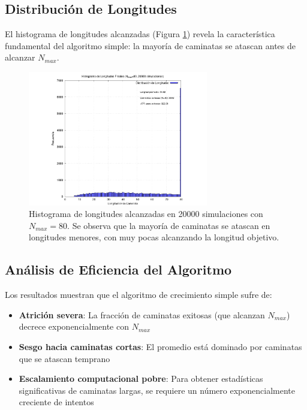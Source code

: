 \documentclass[11pt,a4paper]{article}
\begin{document}
\subsection{Distribución de Longitudes}
El histograma de longitudes alcanzadas (Figura \ref{fig:saw_histograma}) revela la característica fundamental del algoritmo simple: la mayoría de caminatas se atascan antes de alcanzar $N_{max}$.

\begin{figure}[h!]
    \centering
    \includegraphics[width=0.7\textwidth]{../results/saw_plot_N80_histograma_longitudes.png}
    \caption{Histograma de longitudes alcanzadas en 20000 simulaciones con $N_{max} = 80$. Se observa que la mayoría de caminatas se atascan en longitudes menores, con muy pocas alcanzando la longitud objetivo.}
    \label{fig:saw_histograma}
\end{figure}

\subsection{Análisis de Eficiencia del Algoritmo}
Los resultados muestran que el algoritmo de crecimiento simple sufre de:

\begin{itemize}
    \item \textbf{Atrición severa}: La fracción de caminatas exitosas (que alcanzan $N_{max}$) decrece exponencialmente con $N_{max}$
    \item \textbf{Sesgo hacia caminatas cortas}: El promedio está dominado por caminatas que se atascan temprano
    \item \textbf{Escalamiento computacional pobre}: Para obtener estadísticas significativas de caminatas largas, se requiere un número exponencialmente creciente de intentos
\end{itemize}
\end{document}
